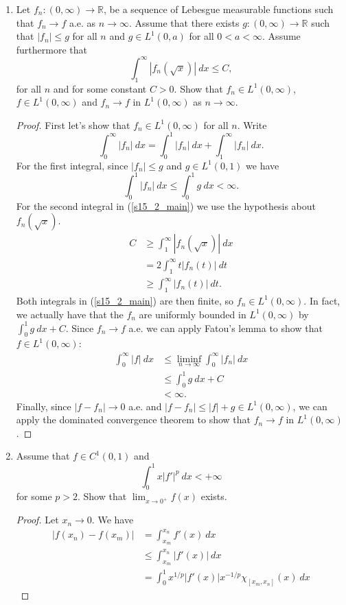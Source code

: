 \documentclass[11pt,letterpaper]{report}
\newcommand{\reals}{\mathbb{R}}
\begin{document}
\begin{enumerate}
	\item Let $f_n: (0, \infty)\to \reals$, be a sequence of Lebesgue measurable functions such that $f_n\to f$ a.e. as $n\to \infty$. Assume that there exists $g: (0, \infty)\to \reals$ such that $|f_n|\leq g$ for all $n$ and $g\in L^1(0, a)$ for all $0<a<\infty$. Assume furthermore that
	\[
	\int_1^\infty |f_n(\sqrt{x})|\ dx\leq C,
	\]
	for all $n$ and for some constant $C>0$. Show that $f_n\in L^1(0, \infty)$, $f\in L^1(0, \infty)$ and $f_n\to f$ in $L^1(0, \infty)$ as $n\to \infty$.
	\begin{proof}
		First let's show that $f_n\in L^1(0, \infty)$ for all $n$. Write
		\begin{equation}\label{s15_2_main}
		\int_0^\infty |f_n|\ dx = \int_0^1|f_n|\ dx + \int_1^\infty |f_n|\ dx.
		\end{equation}
		For the first integral, since $|f_n| \leq g$ and $g\in L^1(0, 1)$ we have
		\[
		\int_0^1|f_n|\ dx \leq \int_0^1 g\ dx <\infty.
		\]
		For the second integral in (\ref{s15_2_main}) we use the hypothesis about $f_n(\sqrt{x})$.
		\begin{align*}
			C &\geq \int_1^\infty |f_n(\sqrt{x})|\ dx\\
			&= 2\int_1^\infty t|f_n(t)|\ dt\\
			&\geq \int_1^\infty |f_n(t)|\ dt.
		\end{align*}
		Both integrals in (\ref{s15_2_main}) are then finite, so $f_n\in L^1(0, \infty)$. In fact, we actually have that the $f_n$ are uniformly bounded in $L^1(0, \infty)$ by $\int_0^1g\ dx + C$. Since $f_n\to f$ a.e. we can apply Fatou's lemma to show that $f\in L^1(0, \infty)$:
		\begin{align*}
			\int_0^\infty |f|\ dx &\leq \liminf_{n\to \infty}\int_0^\infty |f_n|\ dx\\
			&\leq \int_0^1 g\ dx + C\\
			&<\infty.
		\end{align*}
		Finally, since $|f-f_n|\to 0$ a.e. and $|f-f_n| \leq |f| + g\in L^1(0, \infty)$, we can apply the dominated convergence theorem to show that $f_n\to f$ in $L^1(0, \infty)$.
	\end{proof}

	\item Assume that $f\in C^1(0, 1)$ and
	\[
	\int_0^1x|f'|^p\ dx <+\infty
	\]
	for some $p>2$. Show that $\lim_{x\to 0^+}f(x)$ exists.
	\begin{proof}
		Let $x_n\to 0$. We have
		\begin{align*}
			|f(x_n)-f(x_m)| &= \int_{x_m}^{x_n}f'(x)\ dx\\
			&\leq \int_{x_m}^{x_n}|f'(x)|\ dx\\
			&= \int_0^1x^{1/p}|f'(x)|x^{-1/p}\chi_{[x_m, x_n]}(x)\ dx
		\end{align*}
	\end{proof}
\end{enumerate}
\end{document}
